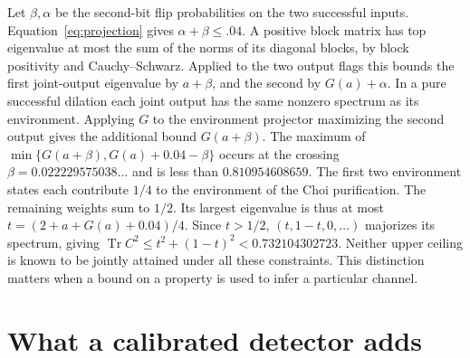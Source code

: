 \documentclass[11pt,letterpaper]{article}
\newcommand{\tr}{\operatorname{Tr}}\newcommand{\TV}{\operatorname{TV}}\newcommand{\E}{\mathbb E}\newcommand{\id}{\mathbb I}\newcommand{\calB}{\mathcal B}\newcommand{\norm}[1]{\left\lVert#1\right\rVert}
\begin{document}
Let $\beta,\alpha$ be the second-bit flip probabilities on the two successful inputs. Equation~\eqref{eq:projection} gives $\alpha+\beta\le.04$. A positive block matrix has top eigenvalue at most the sum of the norms of its diagonal blocks, by block positivity and Cauchy–Schwarz. Applied to the two output flags this bounds the first joint-output eigenvalue by $a+\beta$, and the second by $G(a)+\alpha$. In a pure successful dilation each joint output has the same nonzero spectrum as its environment. Applying $G$ to the environment projector maximizing the second output gives the additional bound $G(a+\beta)$. The maximum of $\min\{G(a+\beta),G(a)+0.04-\beta\}$ occurs at the crossing $\beta=0.022229575038\ldots$ and is less than $0.810954608659$. The first two environment states each contribute $1/4$ to the environment of the Choi purification. The remaining weights sum to $1/2$. Its largest eigenvalue is thus at most $t=(2+a+G(a)+0.04)/4$. Since $t>1/2$, $(t,1-t,0,\ldots)$ majorizes its spectrum, giving $\tr C^2\le t^2+(1-t)^2<0.732104302723$. Neither upper ceiling is known to be jointly attained under all these constraints. This distinction matters when a bound on a property is used to infer a particular channel.

\section{What a calibrated detector adds}\label{sec:detector}
\end{document}
